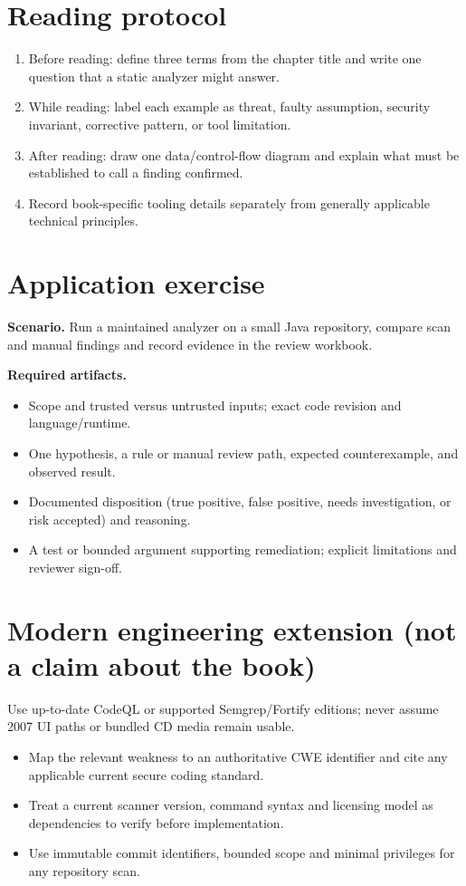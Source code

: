 \documentclass[10pt,letterpaper]{article}
\begin{document}
\section{Reading protocol}
\begin{enumerate}
\item Before reading: define three terms from the chapter title and write one question that a static analyzer might answer.
\item While reading: label each example as threat, faulty assumption, security invariant, corrective pattern, or tool limitation.
\item After reading: draw one data/control-flow diagram and explain what must be established to call a finding confirmed.
\item Record book-specific tooling details separately from generally applicable technical principles.
\end{enumerate}

\section{Application exercise}
\textbf{Scenario.} Run a maintained analyzer on a small Java repository, compare scan and manual findings and record evidence in the review workbook.

\textbf{Required artifacts.}\begin{itemize}
\item Scope and trusted versus untrusted inputs; exact code revision and language/runtime.
\item One hypothesis, a rule or manual review path, expected counterexample, and observed result.
\item Documented disposition (true positive, false positive, needs investigation, or risk accepted) and reasoning.
\item A test or bounded argument supporting remediation; explicit limitations and reviewer sign-off.
\end{itemize}

\section{Modern engineering extension (not a claim about the book)}
Use up-to-date CodeQL or supported Semgrep/Fortify editions; never assume 2007 UI paths or bundled CD media remain usable.

\begin{itemize}
\item Map the relevant weakness to an authoritative CWE identifier and cite any applicable current secure coding standard.
\item Treat a current scanner version, command syntax and licensing model as dependencies to verify before implementation.
\item Use immutable commit identifiers, bounded scope and minimal privileges for any repository scan.
\end{itemize}
\end{document}
